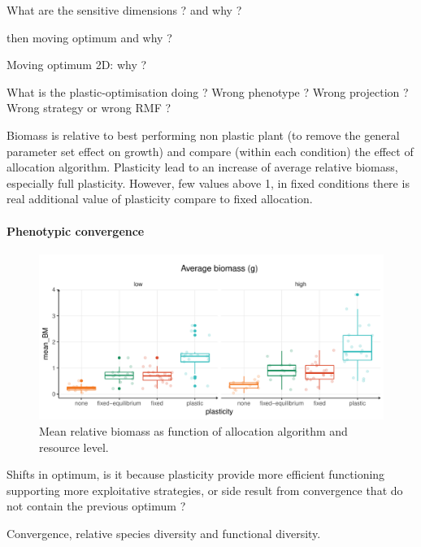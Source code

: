 What are the sensitive dimensions ? and why ? 

then moving optimum and why ?

Moving optimum 2D: why ?

What is the plastic-optimisation doing ? Wrong phenotype ? Wrong projection ? Wrong strategy or wrong RMF ? 


Biomass is relative to best performing non plastic plant (to remove the general parameter set effect on growth) and compare (within each condition) the effect of allocation algorithm. Plasticity lead to an increase of average relative biomass, especially full plasticity. However, few values above 1, in fixed conditions there is real additional value of plasticity compare to fixed allocation.\\

\paragraph{Phenotypic convergence}

\begin{figure}\label{fig:mean_BM_pl}
\includegraphics[width = \textwidth]{./2_PP/Figures/Landscape/plot_BM_allocation.pdf}
\caption{Mean relative biomass as function of allocation algorithm and resource level.}
\end{figure}

Shifts in optimum, is it because plasticity provide more efficient functioning supporting more exploitative strategies, or side result from convergence that do not contain the previous optimum ?

Convergence, relative species diversity and functional diversity.

